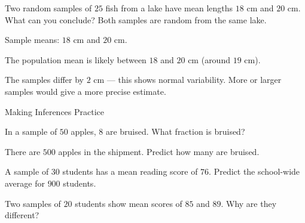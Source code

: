 \begin{stepExample}{Two random samples of $25$ fish from a lake have mean lengths $18$ cm and $20$ cm. What can you conclude?}
     Both samples are random from the same lake.

     Sample means: $18$ cm and $20$ cm.

     The population mean is likely between $18$ and $20$ cm (around $19$ cm).

     The samples differ by $2$ cm — this shows normal variability. More or larger samples would give a more precise estimate.
\end{stepExample}


\newpage
\begin{stepPractice}{Making Inferences Practice}
    \resetProblems

    \prob In a sample of $50$ apples, $8$ are bruised. What fraction is bruised? \answerBlank[2.5cm]

    \prob There are $500$ apples in the shipment. Predict how many are bruised. \answerBlank[2.5cm]

    \prob A sample of $30$ students has a mean reading score of $76$. Predict the school-wide average for $900$ students. \answerBlank[2.5cm]

    \prob Two samples of $20$ students show mean scores of $85$ and $89$. Why are they different? \answerBlank[3.5cm]

\end{stepPractice}
